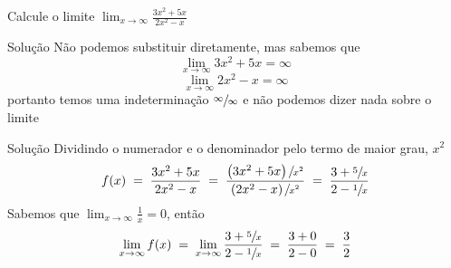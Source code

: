 \begin{question}
Calcule o limite
\(
  \lim_{x \to \infty} \frac{3x^2 + 5x}{2x^2 - x}
\)
\end{question}

\begin{resolution}{Solução}
  Não podemos substituir diretamente, mas sabemos que
  \[
    \lim_{x \to \infty} 3x^2 + 5x = \infty
  \]
  \[
    \lim_{x \to \infty} 2x^2 - x = \infty
  \]
  portanto temos uma indeterminação \(\sfrac{\infty}{\infty}\)
  e não podemos dizer nada sobre o limite
\end{resolution}

\begin{resolution}{Solução}
  Dividindo o numerador e o denominador pelo termo de maior grau, $x^2$
  \[
    f(x)
    \;=\; \frac{3x^2 + 5x}{2x^2 - x}
    \;=\; \frac{\left(3x^2 + 5x\right)\sfrac{}{x^2}}{\left(2x^2 - x\right)\sfrac{}{x^2}}
    \;=\; \frac{3 + \sfrac{5}{x}}{2 - \sfrac{1}{x}}
  \]
  Sabemos que
  \(
    \lim_{x\to\infty} \frac{1}{x} = 0
  \),
  então
  \[
    \lim_{x\to\infty} f(x)
    \;=\; \lim_{x\to\infty} \frac{3 + \sfrac{5}{x}}{2 - \sfrac{1}{x}}
    \;=\; \frac{3 + 0}{2 - 0}
    \;=\; \frac{3}{2}
  \]
\end{resolution}

